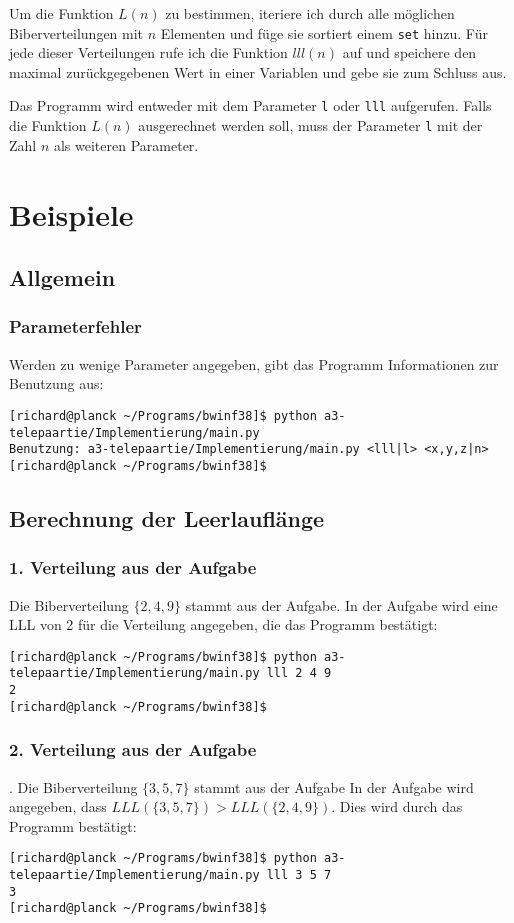 \documentclass[a4paper,10pt,ngerman]{scrartcl}
\begin{document}
Um die Funktion $L(n)$ zu bestimmen, iteriere ich durch alle möglichen Biberverteilungen mit $n$ Elementen und füge sie sortiert einem \texttt{set} hinzu.
Für jede dieser Verteilungen rufe ich die Funktion $lll(n)$ auf und speichere den maximal zurückgegebenen Wert in einer Variablen und gebe sie zum Schluss aus.

Das Programm wird entweder mit dem Parameter \texttt{l} oder \texttt{lll} aufgerufen.
Falls die Funktion $L(n)$ ausgerechnet werden soll, muss der Parameter \texttt{l} mit der Zahl $n$ als weiteren Parameter.

\section{Beispiele}
\subsection{Allgemein}
\subsubsection{Parameterfehler}
Werden zu wenige Parameter angegeben, gibt das Programm Informationen zur Benutzung aus:
\begin{lstlisting}
[richard@planck ~/Programs/bwinf38]$ python a3-telepaartie/Implementierung/main.py
Benutzung: a3-telepaartie/Implementierung/main.py <lll|l> <x,y,z|n>
[richard@planck ~/Programs/bwinf38]$ 
\end{lstlisting}

\subsection{Berechnung der Leerlauflänge}
\subsubsection{1. Verteilung aus der Aufgabe}
Die Biberverteilung $\{2,4,9\}$ stammt aus der Aufgabe.
In der Aufgabe wird eine LLL von 2 für die Verteilung angegeben, die das Programm bestätigt:
\begin{lstlisting}
[richard@planck ~/Programs/bwinf38]$ python a3-telepaartie/Implementierung/main.py lll 2 4 9
2
[richard@planck ~/Programs/bwinf38]$ 
\end{lstlisting}

\subsubsection{2. Verteilung aus der Aufgabe}.
Die Biberverteilung $\{3,5,7\}$ stammt aus der Aufgabe
In der Aufgabe wird angegeben, dass $LLL(\{3,5,7\}) > LLL(\{2,4,9\})$.
Dies wird durch das Programm bestätigt:
\begin{lstlisting}
[richard@planck ~/Programs/bwinf38]$ python a3-telepaartie/Implementierung/main.py lll 3 5 7
3
[richard@planck ~/Programs/bwinf38]$ 
\end{lstlisting}
\end{document}
